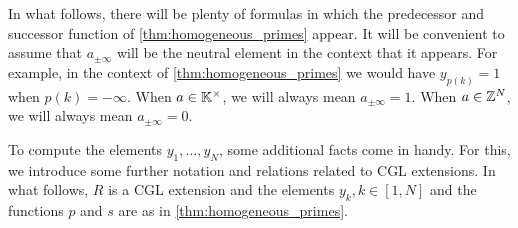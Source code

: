 \begin{convention}

	In what follows, there will be plenty of formulas in which the predecessor and
	successor function of \cref{thm:homogeneous_primes} appear. It will be convenient to
	assume that $a_{\pm \infty}$ will be the neutral element in the context that it
	appears. For example, in the context of \cref{thm:homogeneous_primes} we would have
	$y_{p(k)} = 1$ when $p(k) = -\infty$. When $a \in \mathbb{K}^\times$, we will always mean
	$a_{\pm\infty} = 1$. When $a \in \mathbb{Z}^N$, we will always mean $a_{\pm\infty} = 0$.
\end{convention}

To compute the elements $y_1, \dots, y_N$, some additional facts come in handy. For
this, we introduce some further notation and relations related to CGL extensions. In
what follows, $R$ is a CGL extension and the elements $y_k, k \in [1, N]$ and the
functions $p$ and $s$ are as in \cref{thm:homogeneous_primes}.

